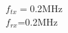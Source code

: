\documentclass[preview]{standalone}
\begin{document}
\begin{center}
$f_{tx}=$0.2MHz\\$f_{rx}$=0.2MHz
\end{center}
\end{document}
